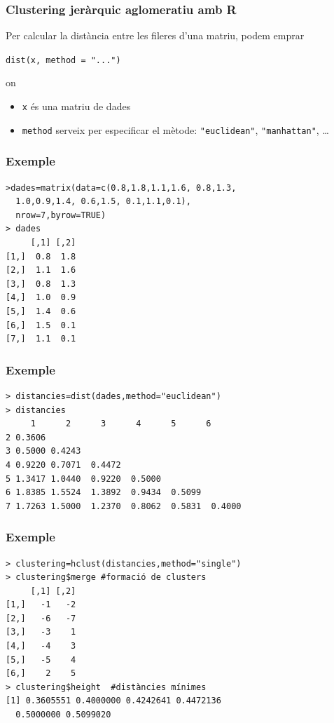 \documentclass[12pt,t]{beamer}
\theoremstyle{plain}
\theoremstyle{definition}
\begin{document}
\begin{frame}[fragile]
\frametitle{Clustering jeràrquic aglomeratiu amb R}


Per calcular la distància entre les fileres d'una matriu, podem emprar
\begin{center}
\verb?dist(x, method = "...")?
\end{center}
on
\begin{itemize}
\item \texttt{x} és una matriu de dades
\medskip

\item \texttt{method} serveix per especificar el mètode:   \verb?"euclidean"?,  \verb?"manhattan"?, \ldots
\end{itemize}
\medskip
\end{frame}



\begin{frame}[fragile]
\frametitle{Exemple}

\begin{verbatim}
>dades=matrix(data=c(0.8,1.8,1.1,1.6, 0.8,1.3,
  1.0,0.9,1.4, 0.6,1.5, 0.1,1.1,0.1), 
  nrow=7,byrow=TRUE)
> dades
     [,1] [,2]
[1,]  0.8  1.8
[2,]  1.1  1.6
[3,]  0.8  1.3
[4,]  1.0  0.9
[5,]  1.4  0.6
[6,]  1.5  0.1
[7,]  1.1  0.1
\end{verbatim}


\end{frame}

\begin{frame}[fragile]
\frametitle{Exemple}

\begin{verbatim}
> distancies=dist(dades,method="euclidean")
> distancies
     1      2      3      4      5      6
2 0.3606                                                  
3 0.5000 0.4243                                        
4 0.9220 0.7071  0.4472                             
5 1.3417 1.0440  0.9220  0.5000                  
6 1.8385 1.5524  1.3892  0.9434  0.5099           
7 1.7263 1.5000  1.2370  0.8062  0.5831  0.4000 
\end{verbatim}
\end{frame}

\begin{frame}[fragile]
\frametitle{Exemple}

\begin{verbatim}
> clustering=hclust(distancies,method="single")
> clustering$merge #formació de clusters
     [,1] [,2]
[1,]   -1   -2
[2,]   -6   -7
[3,]   -3    1
[4,]   -4    3
[5,]   -5    4
[6,]    2    5
> clustering$height  #distàncies mínimes
[1] 0.3605551 0.4000000 0.4242641 0.4472136 
  0.5000000 0.5099020
\end{verbatim}





\end{frame}
\end{document}

